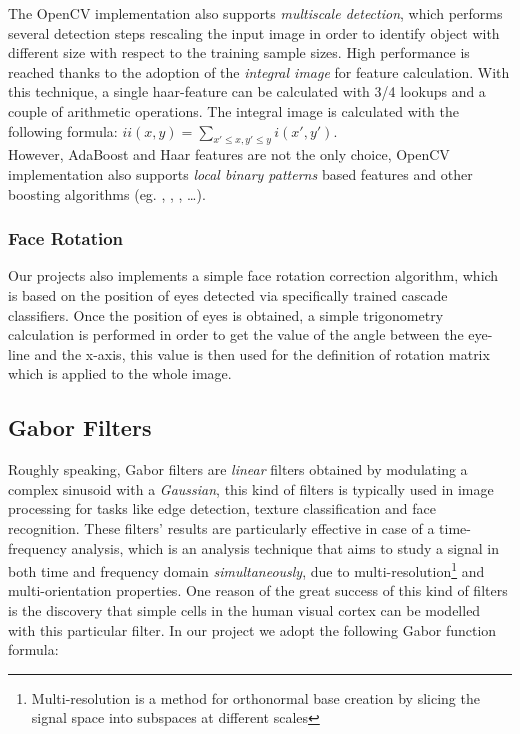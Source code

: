 The OpenCV implementation also supports \emph{multiscale detection}, which performs several detection steps rescaling the input image in order to identify object with different size with respect to the training sample sizes. High performance is reached thanks to the adoption of the \emph{integral image} for feature calculation. With this technique, a single haar-feature can be calculated with 3/4 lookups and a couple of arithmetic operations. The integral image is calculated with the following formula: $ ii(x,y) = \sum_{x' \leq x, y' \leq y}{ i(x',y') } $.\\

However, AdaBoost and Haar features are not the only choice, OpenCV implementation also supports \emph{local binary patterns} based features and other boosting algorithms (eg. , , , \ldots).


\subsubsection*{Face Rotation}

Our projects also implements a simple face rotation correction algorithm, which is based on the position of eyes detected via specifically trained cascade classifiers. Once the position of eyes is obtained, a simple trigonometry calculation is performed in order to get the value of the angle between the eye-line and the x-axis, this value is then used for the definition of rotation matrix which is applied to the whole image.

\subsection{Gabor Filters}

Roughly speaking, Gabor filters are \emph{linear} filters obtained by modulating a complex sinusoid with a \emph{Gaussian}, this kind of filters is typically used in image processing for tasks like edge detection, texture classification and face recognition\cite{gaborApplication}. These filters' results are particularly effective in case of a time-frequency analysis, which is an analysis technique that aims to study a signal in both time and frequency domain \emph{simultaneously}, due to multi-resolution\footnote{Multi-resolution is a method for orthonormal base creation by slicing the signal space into subspaces at different scales} and multi-orientation properties. One reason of the great success of this kind of filters is the discovery that simple cells in the human visual cortex can be modelled with this particular filter. In our project we adopt the following Gabor function formula:


